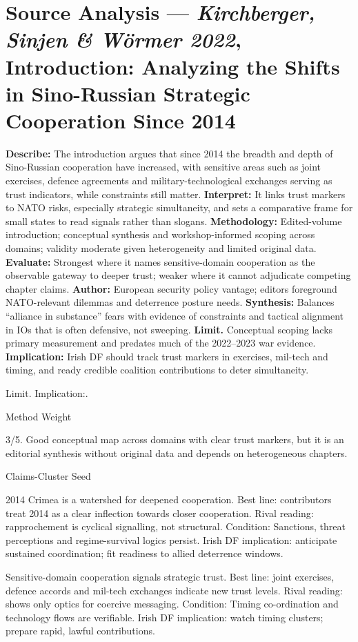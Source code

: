 \section*{Source Analysis — \textit{Kirchberger, Sinjen & Wörmer 2022}, Introduction: Analyzing the Shifts in Sino-Russian Strategic Cooperation Since 2014}
\textbf{Describe:} The introduction argues that since 2014 the breadth and depth of Sino-Russian cooperation have increased, with sensitive areas such as joint exercises, defence agreements and military-technological exchanges serving as trust indicators, while constraints still matter.
\textbf{Interpret:} It links trust markers to NATO risks, especially strategic simultaneity, and sets a comparative frame for small states to read signals rather than slogans.
\textbf{Methodology:} Edited-volume introduction; conceptual synthesis and workshop-informed scoping across domains; validity moderate given heterogeneity and limited original data.
\textbf{Evaluate:} Strongest where it names sensitive-domain cooperation as the observable gateway to deeper trust; weaker where it cannot adjudicate competing chapter claims.
\textbf{Author:} European security policy vantage; editors foreground NATO-relevant dilemmas and deterrence posture needs.
\textbf{Synthesis:} Balances “alliance in substance” fears with evidence of constraints and tactical alignment in IOs that is often defensive, not sweeping.
\textbf{Limit.} Conceptual scoping lacks primary measurement and predates much of the 2022–2023 war evidence.
\textbf{Implication:} Irish DF should track trust markers in exercises, mil-tech and timing, and ready credible coalition contributions to deter simultaneity.

Limit. Implication:.

Method Weight

3/5. Good conceptual map across domains with clear trust markers, but it is an editorial synthesis without original data and depends on heterogeneous chapters.

Claims-Cluster Seed

2014 Crimea is a watershed for deepened cooperation.
Best line: contributors treat 2014 as a clear inflection towards closer cooperation.
Rival reading: rapprochement is cyclical signalling, not structural.
Condition: Sanctions, threat perceptions and regime-survival logics persist.
Irish DF implication: anticipate sustained coordination; fit readiness to allied deterrence windows.

Sensitive-domain cooperation signals strategic trust.
Best line: joint exercises, defence accords and mil-tech exchanges indicate new trust levels.
Rival reading: shows only optics for coercive messaging.
Condition: Timing co-ordination and technology flows are verifiable.
Irish DF implication: watch timing clusters; prepare rapid, lawful contributions.

